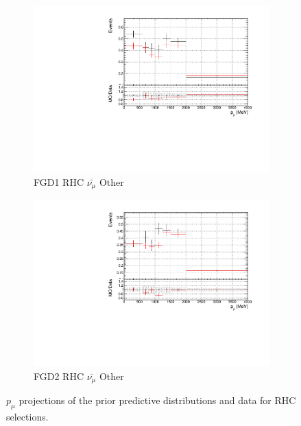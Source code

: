 \begin{figure}[!h]
\begin{subfigure}{0.49\textwidth}
  \centering
  \includegraphics[width=\textwidth]{figs/prioronly1D_p_FGD1_anti-numuCC_other}
  \caption{FGD1 RHC $\bar{\nu_{\mu}}$ Other}
\end{subfigure}
\begin{subfigure}{0.49\textwidth}
  \centering
  \includegraphics[width=\textwidth]{figs/prioronly1D_p_FGD2_anti-numuCC_other}
  \caption{FGD2 RHC $\bar{\nu_{\mu}}$ Other}
\end{subfigure}
\caption{$p_{\mu}$ projections of the prior predictive distributions and data for RHC \numub selections.}
\label{fig:priorpost_rhc_numub_p}
\end{figure}

